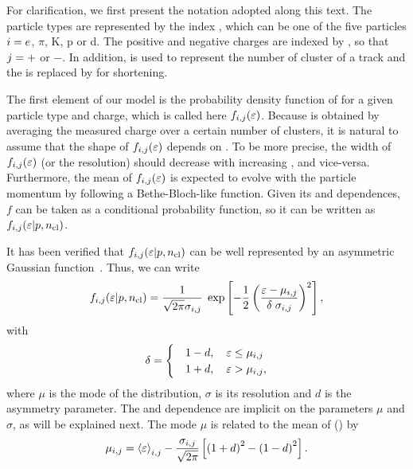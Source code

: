 For clarification, we first present the notation
adopted along this text. The particle types are represented by the index
\ipart, which can be one of the five particles $i=e$, $\pi$, K, p or d.
The positive and negative charges are indexed by
\ich, so that $j = +$ or $-$. In addition, \ncl is used to
represent the number of cluster of a track and the \dedx
is replaced by \eps for shortening.

The first element of our \dedx model is the probability density
function of \eps for a given particle type and charge, which is called
here $f_{i,j}(\mbox{$\varepsilon$})$.
Because \eps is obtained by averaging the measured charge
over a certain number of clusters, it is natural to assume 
that the shape of $f_{i,j}(\mbox{$\varepsilon$})$ depends on \ncl.
To be more precise, the width of $f_{i,j}(\mbox{$\varepsilon$})$
(or the \eps resolution) should decrease
with increasing \ncl, and vice-versa. 
Furthermore, the mean of $f_{i,j}(\mbox{$\varepsilon$})$ is expected  
to evolve with the particle momentum \pp
by following a Bethe-Bloch-like function.
Given its \ncl and \pp dependences, $f$ can
be taken as a conditional probability function,
so it can be written as $f_{i,j}(\mbox{$\varepsilon$}|p,\mbox{$n_{\text{cl}}$})$.

It has been verified that $f_{i,j}(\mbox{$\varepsilon$}|p,\mbox{$n_{\text{cl}}$})$
can be well represented by an asymmetric
Gaussian function~\cite{GaborVeresThesis}. 
Thus, we can write
\begin{equation}
  f_{i,j}(\mbox{$\varepsilon$}|p,\mbox{$n_{\text{cl}}$}) = \frac{1}{\sqrt{2\pi}\sigma_{i,j}} \;
  \exp\left[-\frac{1}{2}\left(\frac{\mbox{$\varepsilon$}-\mu_{i,j}}{\delta \; \sigma_{i,j}}\right)^2\right],
  \label{eq:hadron:dedx:model:pdf}
\end{equation}
with
\begin{equation}
  \delta =
  \begin{cases}
    & 1-d, \ \ \ \mbox{$\varepsilon$} \le \mu_{i,j} \\
    & 1+d, \ \ \ \mbox{$\varepsilon$} > \mu_{i,j}, \\
  \end{cases}
  \label{eq:hadron:dedx:model:asymm}
\end{equation}
where $\mu$ is the mode of the distribution, $\sigma$ is its resolution
and $d$ is the asymmetry parameter. The \pp and \ncl dependence are implicit
on the parameters $\mu$ and $\sigma$, as will be explained next.
The mode $\mu$ is related to the mean of \eps (\meaneps) by
\begin{equation}
  \mu_{i,j} = \mbox{$\langle\varepsilon\rangle$}_{i,j} - \frac{\sigma_{i,j}}{\sqrt{2\pi}}
  \left[\left(1+d\right)^2 - \left(1-d\right)^2 \right].
  \label{eq:hadron:dedx:model:mu}
\end{equation}

